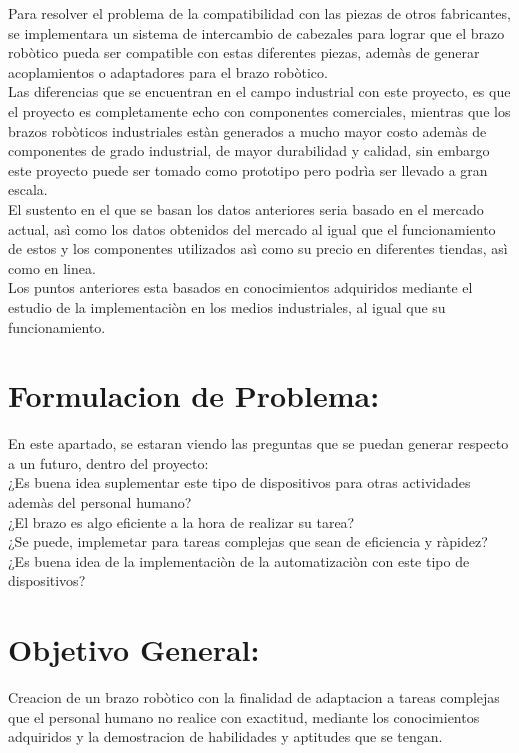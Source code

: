 \documentclass[14pt,a4paper]{article}
\begin{document}
Para resolver el problema de la compatibilidad con las piezas de otros fabricantes, se implementara un sistema de intercambio de cabezales para lograr que el brazo robòtico pueda ser compatible con estas diferentes piezas, ademàs de generar acoplamientos o adaptadores para el brazo robòtico. \\
Las diferencias que se encuentran en el campo industrial con este proyecto, es que el proyecto es completamente echo con componentes comerciales, mientras que los brazos robòticos industriales estàn generados a mucho mayor costo ademàs de componentes de grado industrial, de mayor durabilidad y calidad, sin embargo este proyecto puede ser tomado como prototipo pero podrìa ser llevado a gran escala.\\
El sustento en el que se basan los datos anteriores seria basado en el mercado actual, asì como los datos obtenidos del mercado al igual que el funcionamiento de estos y los componentes utilizados asì como su precio en diferentes tiendas, asì como en linea.\\
Los puntos anteriores esta basados en conocimientos adquiridos mediante el estudio de la implementaciòn en los medios industriales, al igual que su funcionamiento.

\section{Formulacion de Problema:}

En este apartado, se estaran viendo las preguntas que se puedan generar respecto a un futuro, dentro del proyecto:\\

¿Es buena idea suplementar este tipo de dispositivos para otras actividades ademàs del personal humano?\\
¿El brazo es algo eficiente a la hora de realizar su tarea?\\
¿Se puede, implemetar para tareas complejas que sean de eficiencia y ràpidez?\\
¿Es buena idea de la implementaciòn de la automatizaciòn con este tipo de dispositivos? 

\section{Objetivo General:}

Creacion de un brazo robòtico con la finalidad de adaptacion a tareas complejas que el personal humano no realice con exactitud, mediante los conocimientos adquiridos y la demostracion de habilidades y aptitudes que se tengan. 
\end{document}
